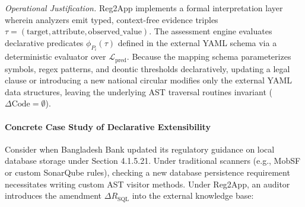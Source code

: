 \textit{Operational Justification.} Reg2App implements a formal interpretation layer wherein analyzers emit typed, context-free evidence triples $\tau = (\text{target}, \text{attribute}, \text{observed\_value})$. The assessment engine evaluates declarative predicates $\phi_{P_i}(\tau)$ defined in the external YAML schema via a deterministic evaluator over $\mathcal{L}_{\text{pred}}$. Because the mapping schema parameterizes symbols, regex patterns, and deontic thresholds declaratively, updating a legal clause or introducing a new national circular modifies only the external YAML data structures, leaving the underlying AST traversal routines invariant ($\Delta \text{Code} = \emptyset$).

\paragraph{Concrete Case Study of Declarative Extensibility} Consider when Bangladesh Bank updated its regulatory guidance on local database storage under Section 4.1.5.21. Under traditional scanners (e.g., MobSF or custom SonarQube rules), checking a new database persistence requirement necessitates writing custom AST visitor methods. Under Reg2App, an auditor introduces the amendment $\Delta R_{\text{SQL}}$ into the external knowledge base:
